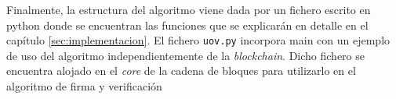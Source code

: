 Finalmente, la estructura del algoritmo viene dada por un fichero escrito en python donde se encuentran las funciones que se explicarán en detalle en el capítulo \ref{sec:implementacion}. El fichero \texttt{uov.py} incorpora main con un ejemplo de uso del algoritmo independientemente de la \textit{blockchain}. Dicho fichero se encuentra alojado en el \textit{core} de la cadena de bloques para utilizarlo en el algoritmo de firma y verificación